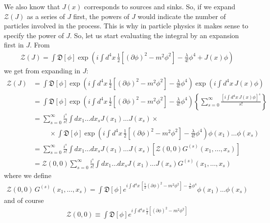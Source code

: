 \documentclass{book}
\theoremstyle{definition}
\newcommand{\p}{\partial}
\newcommand{\f}[2]{\frac{#1}{#2}}
\newcommand{\lp}{\left(}
\newcommand{\rp}{\right)}
\newcommand{\lb}{\left[}
\newcommand{\rb}{\right]}
\newcommand{\lc}{\left\{}
\newcommand{\rc}{\right\}}
\newcommand{\Z}{\mathcal{Z}}
\begin{document}
We also know that $J(x)$ corresponds to sources and sinks. So, if we expand $\Z(J)$ as a series of $J$ first, the powers of $J$ would indicate the number of particles involved in the process. This is why in particle physics it makes sense to specify the power of $J$. So, let us start evaluating the integral by an expansion first in $J$. From 
\begin{align}
\Z(J) = \int \mathfrak{D}[\phi] \exp\lp i\int d^4x\,  \f{1}{2}\lb(\p \phi)^2 - m^2 \phi^2 \rb - \f{\lambda}{4!}\phi^4 + J(x)\phi \rp
\end{align}
we get from expanding in $J$:
\begin{align}
\Z(J) &=  \int \mathfrak{D}[\phi] \exp\lp i\int d^4x\,  \f{1}{2}\lb(\p \phi)^2 - m^2 \phi^2 \rb - \f{\lambda}{4!}\phi^4\rp \exp\lp i\int d^4x\, J(x)\phi \rp \nonumber \\ 
&= \int \mathfrak{D}[\phi] \exp\lp i\int d^4x\,  \f{1}{2}\lb(\p \phi)^2 - m^2 \phi^2 \rb - \f{\lambda}{4!}\phi^4\rp \lc \sum_{s=0}^\infty \f{\lb  i\int d^4x\, J(x)\phi \rb^s}{s!} \rc \nonumber\\
&= \sum^\infty_{s=0}\f{i^s}{s!}\int dx_1\dots dx_s J(x_1)\dots J(x_s)\times\nonumber\\
 &\hspace{1cm}\times \int \mathfrak{D}[\phi] \exp\lp i\int d^4x\,  \f{1}{2}\lb(\p \phi)^2 - m^2 \phi^2 \rb - \f{\lambda}{4!}\phi^4\rp \phi(x_1)\dots \phi(x_s) \nonumber\\
&=  \sum^\infty_{s=0}\f{i^s}{s!}\int dx_1\dots dx_s J(x_1)\dots J(x_s) \lb \Z(0,0)G^{(s)}(x_1,\dots,x_s) \rb \nonumber\\
&= \boxed{\Z(0,0)	\sum^\infty_{s=0}\f{i^s}{s!}\int dx_1\dots dx_s J(x_1)\dots J(x_s)  G^{(s)}(x_1,\dots,x_s) } \nonumber
\end{align}
where we define 
\begin{align}
\boxed{\Z(0,0)\,G^{(s)}(x_1,\dots,x_s) = \int \mathfrak{D}[\phi] e^{ i\int d^4x\, \lb \f{1}{2}(\p \phi)^2 - m^2 \phi^2 \rb - \f{\lambda}{4!}\phi^4} \phi(x_1)\dots \phi(x_s)}
\end{align}
and of course
\begin{align}
\boxed{\Z(0,0) \equiv  \int \mathfrak{D}[\phi] e^{ i\int d^4x\,  \f{1}{2}\lb(\p \phi)^2 - m^2 \phi^2 \rb}}
\end{align}
\end{document}
